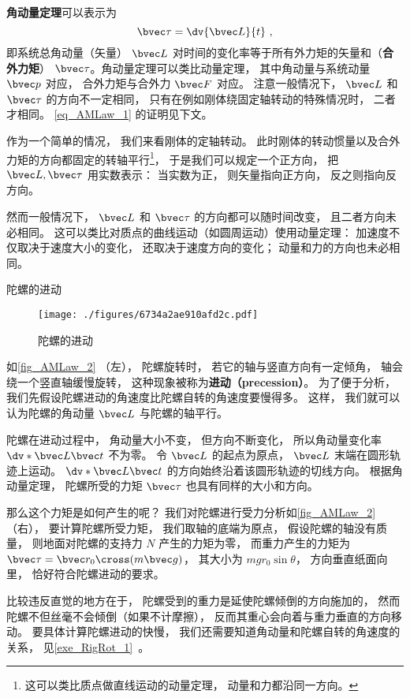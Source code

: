 
\textbf{角动量定理}可以表示为
\begin{equation}\label{eq_AMLaw_1}
\bvec \tau = \dv{\bvec L}{t}~,
\end{equation}
即系统总角动量（矢量） $\bvec L$ 对时间的变化率等于所有外力矩的矢量和（\textbf{合外力矩}） $\bvec \tau$。角动量定理可以类比动量定理， 其中角动量与系统动量 $\bvec p$ 对应， 合外力矩与合外力 $\bvec F$ 对应。 注意一般情况下， $\bvec L$ 和 $\bvec \tau$ 的方向不一定相同， 只有在例如刚体绕固定轴转动的特殊情况时， 二者才相同。 \autoref{eq_AMLaw_1} 的证明见下文。

作为一个简单的情况， 我们来看刚体的定轴转动。 此时刚体的转动惯量以及合外力矩的方向都固定的转轴平行\footnote{这可以类比质点做直线运动的动量定理， 动量和力都沿同一方向。}， 于是我们可以规定一个正方向， 把 $\bvec L, \bvec \tau$ 用实数表示： 当实数为正， 则矢量指向正方向， 反之则指向反方向。

然而一般情况下， $\bvec L$ 和 $\bvec \tau$ 的方向都可以随时间改变， 且二者方向未必相同。 这可以类比对质点的曲线运动（如圆周运动）使用动量定理： 加速度不仅取决于速度大小的变化， 还取决于速度方向的变化； 动量和力的方向也未必相同。
\begin{example}{陀螺的进动}\label{ex_AMLaw_2}
\begin{figure}[ht]
\centering
\texttt{[image: ./figures/6734a2ae910afd2c.pdf]}
\caption{陀螺的进动}\label{fig_AMLaw_2}
\end{figure}

如\autoref{fig_AMLaw_2} （左）， 陀螺旋转时， 若它的轴与竖直方向有一定倾角， 轴会绕一个竖直轴缓慢旋转， 这种现象被称为\textbf{进动（precession）}。 为了便于分析， 我们先假设陀螺进动的角速度比陀螺自转的角速度要慢得多。 这样， 我们就可以认为陀螺的角动量 $\bvec L$ 与陀螺的轴平行。

陀螺在进动过程中， 角动量大小不变， 但方向不断变化， 所以角动量变化率 $\dv*{\bvec L}{\bvec t}$ 不为零。 令 $\bvec L$ 的起点为原点， $\bvec L$ 末端在圆形轨迹上运动。 $\dv*{\bvec L}{\bvec t}$ 的方向始终沿着该圆形轨迹的切线方向。 根据角动量定理， 陀螺所受的力矩 $\bvec \tau$ 也具有同样的大小和方向。

那么这个力矩是如何产生的呢？ 我们对陀螺进行受力分析如\autoref{fig_AMLaw_2} （右）， 要计算陀螺所受力矩， 我们取轴的底端为原点， 假设陀螺的轴没有质量， 则地面对陀螺的支持力 $N$ 产生的力矩为零， 而重力产生的力矩为 $\bvec \tau = \bvec r_0 \cross (m\bvec g)$， 其大小为 $mgr_0\sin\theta$， 方向垂直纸面向里， 恰好符合陀螺进动的要求。

比较违反直觉的地方在于， 陀螺受到的重力是延使陀螺倾倒的方向施加的， 然而陀螺不但丝毫不会倾倒（如果不计摩擦）， 反而其重心会向着与重力垂直的方向移动。 要具体计算陀螺进动的快慢， 我们还需要知道角动量和陀螺自转的角速度的关系， 见\autoref{exe_RigRot_1}~。
\end{example}


